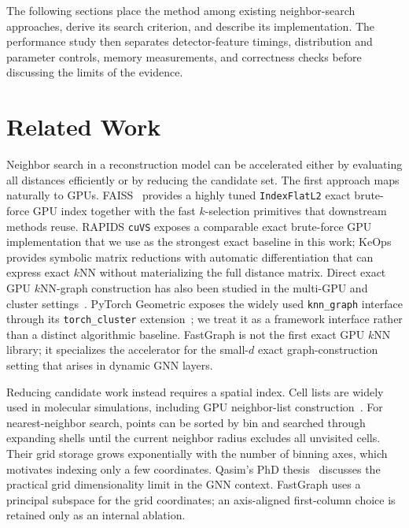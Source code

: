 \documentclass[final,3p,11pt]{elsarticle}
\begin{document}
The following sections place the method among existing neighbor-search
approaches, derive its search criterion, and describe its implementation.
The performance study then separates detector-feature timings,
distribution and parameter controls, memory measurements, and correctness
checks before discussing the limits of the evidence.

\section{Related Work}
\label{sec:related-work}

Neighbor search in a reconstruction model can be accelerated either by
evaluating all distances efficiently or by reducing the candidate set.
The first approach maps naturally to GPUs. FAISS~\cite{johnson2019billion} provides a
highly tuned \texttt{IndexFlatL2} exact brute-force GPU index together
with the fast $k$-selection primitives that downstream methods reuse.
RAPIDS \texttt{cuVS} exposes a comparable exact brute-force GPU
implementation that we use as the strongest exact baseline in this
work; KeOps~\cite{feydy2020fast} provides symbolic matrix reductions
with automatic differentiation that can express exact $k$NN without
materializing the full distance matrix. Direct exact GPU $k$NN-graph
construction has also been studied in the multi-GPU and cluster
settings~\cite{dashti2013efficient,komarov2014fast}. PyTorch Geometric
exposes the widely used \texttt{knn\_graph} interface through its
\texttt{torch\_cluster} extension~\cite{fey2019pyg}; we treat it as a
framework interface rather than a distinct algorithmic baseline.
FastGraph is not
the first exact GPU $k$NN library; it specializes the accelerator for
the small-$d$ exact graph-construction setting that arises in dynamic
GNN layers.

Reducing candidate work instead requires a spatial index. Cell lists
are widely used in molecular simulations, including GPU neighbor-list
construction~\cite{verlet1967,howard2016neighbor}. For nearest-neighbor
search, points can be sorted by bin and searched through expanding
shells until the current neighbor radius excludes all unvisited cells.
Their grid storage grows exponentially with the number of binning
axes, which motivates indexing only a few coordinates.
Qasim's PhD thesis~\cite{qasim2023thesis} discusses the practical grid
dimensionality limit in the GNN context. FastGraph uses a principal subspace
for the grid coordinates; an axis-aligned first-column choice is retained only
as an internal ablation.
\end{document}
